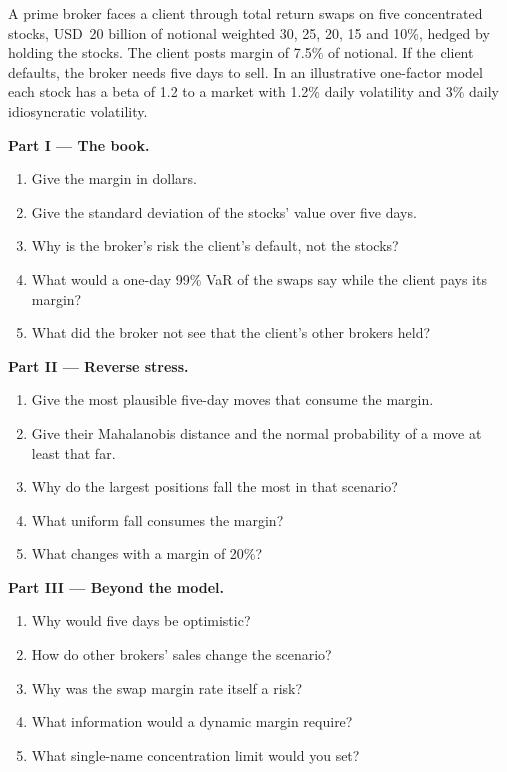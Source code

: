 \begin{problem}\label{pb:rc:stress-testing-and-scenarios:1}
A prime broker faces a client through total return swaps on five concentrated stocks, USD~20
billion of notional weighted 30, 25, 20, 15 and 10\%, hedged by holding the stocks. The client posts
margin of 7.5\% of notional. If the client defaults, the broker needs five days to sell. In an
illustrative one-factor model each stock has a beta of 1.2 to a market with 1.2\% daily volatility
and 3\% daily idiosyncratic volatility.

\medskip\noindent\textbf{Part I --- The book.}
\begin{enumerate}
\item Give the margin in dollars.
\item Give the standard deviation of the stocks' value over five days.
\item Why is the broker's risk the client's default, not the stocks?
\item What would a one-day 99\% VaR of the swaps say while the client pays its margin?
\item What did the broker not see that the client's other brokers held?
\end{enumerate}

\medskip\noindent\textbf{Part II --- Reverse stress.}
\begin{enumerate}[resume]
\item Give the most plausible five-day moves that consume the margin.
\item Give their Mahalanobis distance and the normal probability of a move at least that far.
\item Why do the largest positions fall the most in that scenario?
\item What uniform fall consumes the margin?
\item What changes with a margin of 20\%?
\end{enumerate}

\medskip\noindent\textbf{Part III --- Beyond the model.}
\begin{enumerate}[resume]
\item Why would five days be optimistic?
\item How do other brokers' sales change the scenario?
\item Why was the swap margin rate itself a risk?
\item What information would a dynamic margin require?
\item What single-name concentration limit would you set?
\end{enumerate}


\end{problem}
